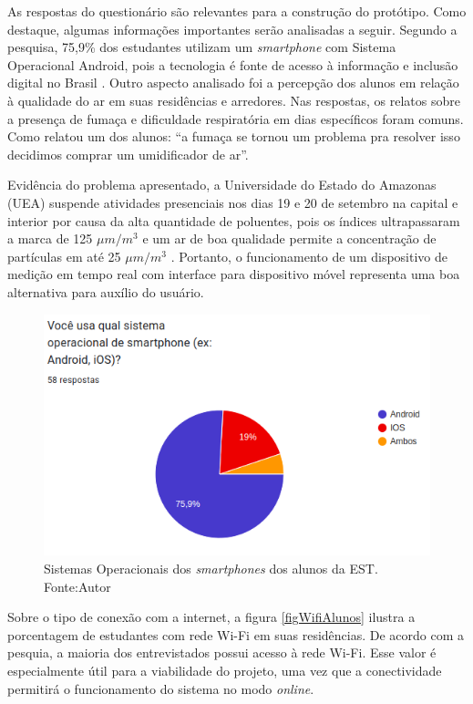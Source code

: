 As respostas do questionário são relevantes para a construção do protótipo. Como destaque, algumas informações importantes serão analisadas a seguir. Segundo a pesquisa, 
75,9\% dos estudantes utilizam um \textit{smartphone} com 
Sistema Operacional Android, pois a tecnologia é fonte de acesso à informação e inclusão digital no Brasil \cite{impacto-android-brasil}. Outro aspecto analisado foi 
a percepção dos alunos em relação à qualidade do ar em suas residências e arredores. Nas respostas, os relatos sobre a presença de fumaça e dificuldade respiratória em dias específicos foram comuns. Como relatou um dos alunos: ``a fumaça se tornou um problema pra resolver isso decidimos comprar um umidificador de ar''. 

Evidência do problema apresentado, a Universidade do Estado do Amazonas (UEA) suspende atividades presenciais nos dias 19 e 20 de setembro na capital e interior por causa 
da alta quantidade de poluentes, pois os índices ultrapassaram a marca de 125 $\mu m/m^{3}$ e um ar de boa qualidade permite a concentração de partículas em  até 25 $\mu m/m^{3}$ \cite{uea-queima-fecha}. Portanto, 
o funcionamento de um dispositivo de medição em tempo real com interface para dispositivo móvel representa uma boa alternativa para auxílio do usuário.

\begin{figure}[ht]
    \centering
    \includegraphics[width=.67\textwidth]{img/graf1-SO-smartphone.png}
    \caption{Sistemas Operacionais dos \textit{smartphones} dos alunos da EST. Fonte:Autor}\label{figSOsmartphone}
\end{figure}

Sobre o tipo de conexão com a internet, a figura \ref{figWifiAlunos} ilustra a porcentagem de estudantes com rede Wi-Fi em suas residências. De acordo com a pesquia,  
a maioria dos entrevistados possui acesso à rede Wi-Fi. Esse valor é especialmente útil para a viabilidade do projeto, uma vez que a conectividade permitirá o funcionamento do sistema no modo \textit{online}.

